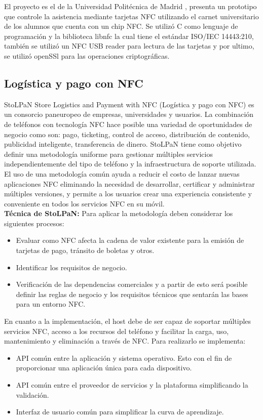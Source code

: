 \documentclass[11pt,openany]{book}
\newcounter{ns}
\begin{document}
	El proyecto es el de la Universidad Politécnica de Madrid\cite{CondeGomez2017} , presenta un prototipo que controle la asistencia mediante tarjetas NFC utilizando el carnet universitario de los alumnos que cuenta con un chip NFC. Se utilizó C como lenguaje de programación y la biblioteca libnfc la cual tiene el estándar ISO/IEC 14443:210, también se utilizó un NFC USB reader para lectura de las tarjetas y por ultimo, se utilizó openSSl para las operaciones criptográficas.

	\subsection{Logística y pago con NFC \cite{Benyo2007,Benyo2009}}
	StoLPaN Store Logistics and Payment with NFC (Logística y pago con NFC) es un consorcio paneuropeo de empresas, universidades y usuarios. La combinación de teléfonos  con tecnología NFC hace posible una variedad de oportunidades de negocio como son: pago, ticketing, control de acceso, distribución de contenido, publicidad inteligente, transferencia de dinero. StoLPaN tiene como objetivo definir una metodología uniforme para gestionar múltiples servicios independientemente del tipo de teléfono y la infraestructura de soporte utilizada. El uso de una metodología común ayuda a reducir el costo de lanzar nuevas aplicaciones NFC eliminando la necesidad de desarrollar, certificar y administrar múltiples versiones, y permite a los usuarios crear una experiencia consistente y conveniente en todos los servicios NFC en su móvil.\\
	\textbf{Técnica de StoLPaN: }Para aplicar la metodología deben considerar los siguientes procesos:
		\begin{itemize}
			\item Evaluar como NFC afecta la cadena de valor existente para la emisión de tarjetas de pago, tránsito de boletas y otros.
			\item Identificar los requisitos de negocio.
			\item Verificación de las dependencias comerciales y a partir de esto será posible definir las reglas de negocio y los requisitos técnicos que sentarán las bases para un entorno NFC.
		\end{itemize}			
	En cuanto a la implementación, el host debe de ser capaz de soportar múltiples servicios NFC, acceso a los recursos del teléfono y facilitar la carga, uso, mantenimiento y eliminación a través de NFC. Para realizarlo se implementa:
	\begin{itemize}
		\item API común entre la aplicación y sistema operativo. Esto con el fin de proporcionar una aplicación única para cada dispositivo.
		\item API común entre el proveedor de servicios y la plataforma simplificando la validación.
		\item Interfaz de usuario común para simplificar la curva de aprendizaje.
	\end{itemize}
\end{document}

